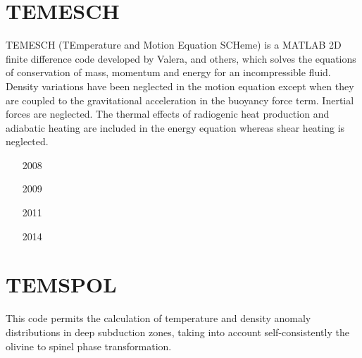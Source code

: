 
\section{TEMESCH} 

TEMESCH (TEmperature
and Motion Equation SCHeme) is a MATLAB 2D finite difference code 
developed by Valera, and others, which
solves the equations of conservation of mass, momentum and energy
for an incompressible ﬂuid. Density variations have been neglected in
the motion equation except when they are coupled to the gravitational
acceleration in the buoyancy force term. Inertial forces are neglected. 
The thermal effects of radiogenic heat production and adiabatic heating 
are included in the energy equation 
whereas shear heating is neglected.

\begin{small}
\begin{itemize}
\item[2008]
\textcite{vanv08}
\item[2009]
\textcite{vale09}
\item[2011]
\textcite{vanj11}
\item[2014]
\textcite{vanb14}
\end{itemize}
\end{small}

\section{TEMSPOL} 
This code permits the calculation of temperature and density anomaly 
distributions in deep subduction zones, taking into account self-consistently 
the olivine to spinel phase transformation.

\begin{small}
\begin{itemize}
\item[\twothousandfour]  
\textcite{nevc04}
\item[\twothousandfive]  
\textcite{canv05}
\item[\twothousandfourteen]  
\textcite{duqo14}
\end{itemize}
\end{small}

